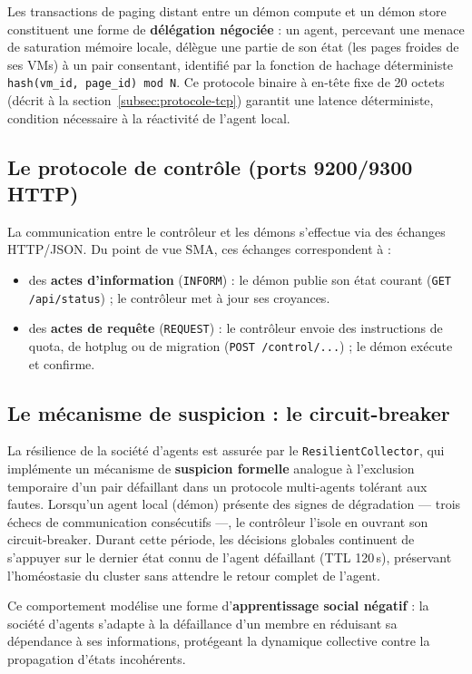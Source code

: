 Les transactions de paging distant entre un démon compute et un démon store constituent une forme de \textbf{délégation négociée} : un agent, percevant une menace de saturation mémoire locale, délègue une partie de son état (les pages froides de ses VMs) à un pair consentant, identifié par la fonction de hachage déterministe \texttt{hash(vm\_id, page\_id) mod N}. Ce protocole binaire à en-tête fixe de 20 octets (décrit à la section~\ref{subsec:protocole-tcp}) garantit une latence déterministe, condition nécessaire à la réactivité de l'agent local.

\subsection{Le protocole de contrôle (ports 9200/9300 HTTP)}

La communication entre le contrôleur et les démons s'effectue via des échanges HTTP/JSON. Du point de vue SMA, ces échanges correspondent à :
\begin{itemize}
    \item des \textbf{actes d'information} (\texttt{INFORM}) : le démon publie son état courant (\texttt{GET /api/status}) ; le contrôleur met à jour ses croyances.
    \item des \textbf{actes de requête} (\texttt{REQUEST}) : le contrôleur envoie des instructions de quota, de hotplug ou de migration (\texttt{POST /control/...}) ; le démon exécute et confirme.
\end{itemize}

\subsection{Le mécanisme de suspicion : le circuit-breaker}

La résilience de la société d'agents est assurée par le \texttt{ResilientCollector}, qui implémente un mécanisme de \textbf{suspicion formelle} analogue à l'exclusion temporaire d'un pair défaillant dans un protocole multi-agents tolérant aux fautes. Lorsqu'un agent local (démon) présente des signes de dégradation — trois échecs de communication consécutifs —, le contrôleur l'isole en ouvrant son circuit-breaker. Durant cette période, les décisions globales continuent de s'appuyer sur le dernier état connu de l'agent défaillant (TTL 120\,s), préservant l'homéostasie du cluster sans attendre le retour complet de l'agent.

Ce comportement modélise une forme d'\textbf{apprentissage social négatif} : la société d'agents s'adapte à la défaillance d'un membre en réduisant sa dépendance à ses informations, protégeant la dynamique collective contre la propagation d'états incohérents.

